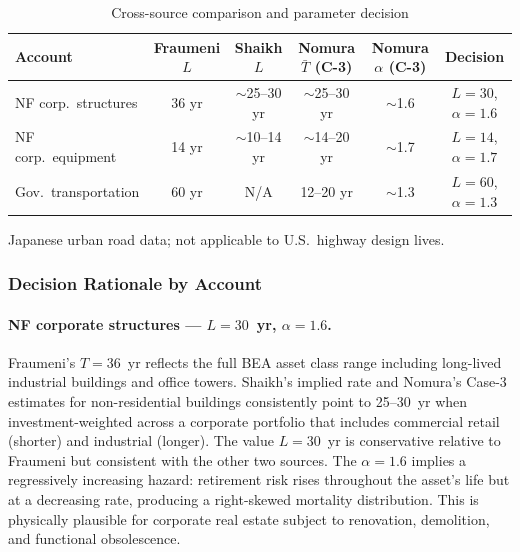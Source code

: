 \begin{table}[htbp]
\centering
\caption{Cross-source comparison and parameter decision}
\label{tab:ret:cross_source}
\begin{threeparttable}
\begin{tabular}{lccccc}
\toprule
Account & Fraumeni $L$ & Shaikh $L$ & Nomura $\bar{T}$ (C-3) & Nomura $\alpha$ (C-3) & Decision \\
\midrule
NF corp.\ structures   & 36 yr & $\sim$25--30 yr & $\sim$25--30 yr & $\sim$1.6 & $L = 30$, $\alpha = 1.6$ \\
NF corp.\ equipment    & 14 yr & $\sim$10--14 yr & $\sim$14--20 yr & $\sim$1.7 & $L = 14$, $\alpha = 1.7$ \\
Gov.\ transportation   & 60 yr & N/A             & 12--20 yr\tnote{a} & $\sim$1.3 & $L = 60$, $\alpha = 1.3$ \\
\bottomrule
\end{tabular}
\begin{tablenotes}
\small
\item[a] Japanese urban road data; not applicable to U.S.\ highway design lives.
\end{tablenotes}
\end{threeparttable}
\end{table}


\subsubsection{Decision Rationale by Account}
\label{app:ret:rationale}

\paragraph{NF corporate structures --- $L = 30$~yr, $\alpha = 1.6$.}
Fraumeni's $T = 36$~yr reflects the full BEA asset class range including
long-lived industrial buildings and office towers. Shaikh's implied rate and
Nomura's Case-3 estimates for non-residential buildings consistently point to
25--30~yr when investment-weighted across a corporate portfolio that includes
commercial retail (shorter) and industrial (longer). The value $L = 30$~yr is
conservative relative to Fraumeni but consistent with the other two sources.
The $\alpha = 1.6$ implies a regressively increasing hazard: retirement risk
rises throughout the asset's life but at a decreasing rate, producing a
right-skewed mortality distribution. This is physically plausible for corporate
real estate subject to renovation, demolition, and functional obsolescence.

